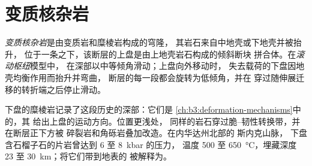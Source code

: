 \section{变质核杂岩}\label{sec:b3:extension-strike-slip:core}

\begin{definition}\label{def:b3:extension-strike-slip:core-complex}
\emph{变质核杂岩}是由变质岩和糜棱岩构成的穹隆，
其岩石来自中地壳或下地壳并被抬升，
位于一条之下，该断层的上盘是由上地壳岩石构成的倾斜断块
拼合体。在\emph{滚动枢纽}模型中，
在深部以中等倾角滑动；上盘向外移动时，
失去载荷的下盘因地壳均衡作用而抬升并弯曲，
断层的每一段都会旋转为低倾角，并在
穿过随伸展迁移的转折端之后停止滑动。
\end{definition}

下盘的糜棱岩记录了这段历史的深部：它们是
\cref{ch:b3:deformation-mechanisms}中的，其
给出上盘的运动方向。位置更浅处，
同样的岩石穿过脆–韧性转换带，并在断层正下方被
碎裂岩和角砾岩叠加改造。在内华达州北部的 斯内克山脉，
下盘含石榴子石的片岩曾达到 6 至 \qty{8}{kbar} 的压力，
温度 500 至 \qty{650}{\celsius}，埋藏深度 23 至 \qty{30}{km}；将它们带到地表的
被解释为。

